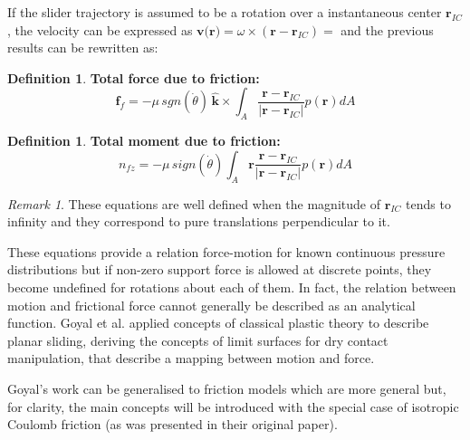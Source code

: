 \documentclass[12,twoside]{TFG-GM}
\theoremstyle{definition}
\newtheorem{definition}[theorem]{Definition}
\theoremstyle{remark}
\newtheorem{remark}[theorem]{Remark}
\begin{document}
If the slider trajectory is assumed to be a rotation over a instantaneous center $\textbf{r}_{IC}$, the velocity can be expressed as $\textbf{v(r)} = \omega \times (\textbf{r} - \textbf{r}_{IC}) = $ and the previous results can be rewritten as:
\begin{definition} \textbf{Total force due to friction:} 
\begin{equation}
\textbf{f}_f = - \mu \, sgn(\dot{\theta}) \, \hat{\textbf{k}} \times \int_A \dfrac{\textbf{r} - \textbf{r}_{IC}}{|\textbf{r} - \textbf{r}_{IC}|} p(\textbf{r}) dA
\end{equation}
\end{definition}
\begin{definition} \label{def:} \textbf{Total moment due to friction:}
\begin{equation} \label{eq:momentum_cor}
n_{fz} = - \mu  \, sign(\dot{\theta}) \int_A \textbf{r}  \dfrac{\textbf{r} - \textbf{r}_{IC}}{|\textbf{r} - \textbf{r}_{IC}|} p(\textbf{r}) dA
\end{equation}
\end{definition}

\begin{remark} 
These equations are well defined when the magnitude of $\textbf{r}_{IC}$ tends to infinity and they correspond to pure translations perpendicular to it.
\end{remark}

These equations provide a relation force-motion for known continuous pressure distributions but if non-zero support force is allowed at discrete points, they become undefined for rotations about each of them. In fact, the relation between motion and frictional force cannot generally be described as an analytical function. Goyal et al. \cite{planar_sliding1}\cite{planar_sliding2} applied concepts of classical plastic theory to describe planar sliding, deriving the concepts of limit surfaces for dry contact manipulation, that describe a mapping between motion and force.

Goyal's work can be generalised to friction models which are more general but, for clarity, the main concepts will be introduced with the special case of isotropic Coulomb friction (as was presented in their original paper).
\end{document}
